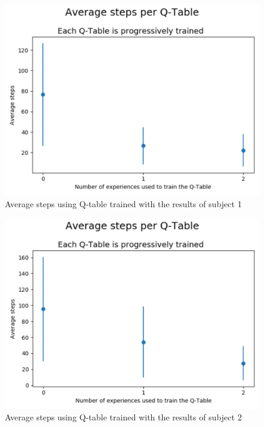 \documentclass[journal]{IEEEtran}
\begin{document}
\begin{figure}[h]
        \centering
        \includegraphics[scale=0.4]{Images/Average_steps/alex.png} 
        \caption{Average steps using Q-table trained with the results of subject 1}
        \label{fig:avg_steps_1}
\end{figure}


\begin{figure}[h]
        \centering
        \includegraphics[scale=0.4]{Images/Average_steps/gonza.png} 
        \caption{Average steps using Q-table trained with the results of subject 2}
        \label{fig:avg_steps_2}
\end{figure}
\end{document}
